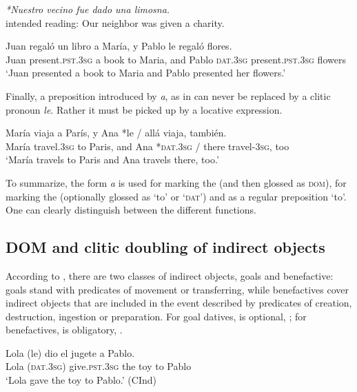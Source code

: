 \documentclass[output=paper]{LSP/langsci}
\begin{document}
\ea%
\label{11-he-ex:30}
\textit{*Nuestro vecino fue dado una limosna.}\\
intended reading: Our neighbor was given a charity.
\z

\ea%
\label{11-he-ex:31}
\gll Juan regaló un libro a María, y Pablo le regaló flores.\\
Juan present.\textsc{pst.3sg} a book to Maria, and Pablo \textsc{dat.3sg} present.\textsc{pst.3sg} flowers\\
\glt ‘Juan presented a book to Maria and Pablo presented her flowers.’
\z

Finally, a preposition introduced by \textit{a}, as in  can never be replaced by a clitic pronoun \textit{le}. Rather it must be picked up by a locative expression.

\ea%
\label{11-he-ex:32}
\gll María viaja a París, y Ana *le / allá viaja, también.\\
María travel.\textsc{3sg} to Paris, and Ana *\textsc{dat.3sg} / there travel-\textsc{3sg}, too\\
\glt ‘María travels to Paris and Ana travels there, too.’
\z

To summarize, the form \textit{a} is used for marking the  (and then glossed as \textsc{dom}), for marking the  (optionally glossed as ‘to’ or ‘\textsc{dat}’) and as a regular preposition ‘to’. 
One can clearly distinguish between the different functions.

\subsection{DOM and clitic doubling of indirect objects}
\label{11-subsec:3-1}

According to \citet[1548]{Campos1999Transitividad}, there are two classes of indirect objects, goals and benefactive: goals stand with predicates of movement or transferring, while benefactives cover indirect objects that are included in the event described by predicates of creation, destruction, ingestion or preparation. For goal datives,  is optional, \cf {}; for benefactives,  is obligatory, \cf {}.

\ea%
\label{11-he-ex:33}
\gll Lola (le) dio el jugete a Pablo.\\ %
Lola (\textsc{dat.3sg}) give.\textsc{pst.3sg} the toy to Pablo\\
\glt ‘Lola gave the toy to Pablo.’ (CInd)
\z
\end{document}
